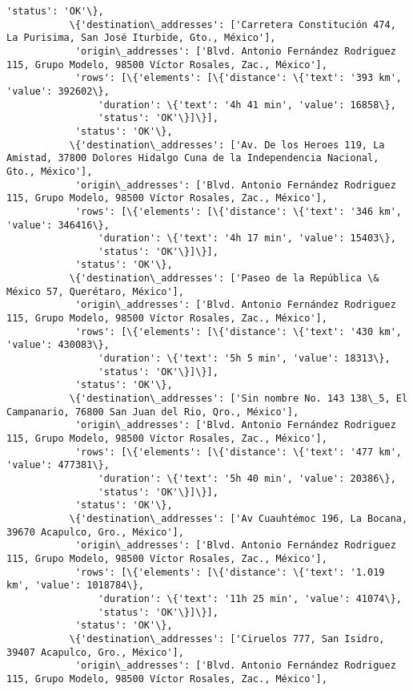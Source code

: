 \documentclass[11pt]{article}
\begin{document}
\begin{Verbatim}[commandchars=\\\{\}]
            'status': 'OK'\},
           \{'destination\_addresses': ['Carretera Constitución 474, La Purisima, San José Iturbide, Gto., México'],
            'origin\_addresses': ['Blvd. Antonio Fernández Rodriguez 115, Grupo Modelo, 98500 Víctor Rosales, Zac., México'],
            'rows': [\{'elements': [\{'distance': \{'text': '393 km', 'value': 392602\},
                'duration': \{'text': '4h 41 min', 'value': 16858\},
                'status': 'OK'\}]\}],
            'status': 'OK'\},
           \{'destination\_addresses': ['Av. De los Heroes 119, La Amistad, 37800 Dolores Hidalgo Cuna de la Independencia Nacional, Gto., México'],
            'origin\_addresses': ['Blvd. Antonio Fernández Rodriguez 115, Grupo Modelo, 98500 Víctor Rosales, Zac., México'],
            'rows': [\{'elements': [\{'distance': \{'text': '346 km', 'value': 346416\},
                'duration': \{'text': '4h 17 min', 'value': 15403\},
                'status': 'OK'\}]\}],
            'status': 'OK'\},
           \{'destination\_addresses': ['Paseo de la República \& México 57, Querétaro, México'],
            'origin\_addresses': ['Blvd. Antonio Fernández Rodriguez 115, Grupo Modelo, 98500 Víctor Rosales, Zac., México'],
            'rows': [\{'elements': [\{'distance': \{'text': '430 km', 'value': 430083\},
                'duration': \{'text': '5h 5 min', 'value': 18313\},
                'status': 'OK'\}]\}],
            'status': 'OK'\},
           \{'destination\_addresses': ['Sin nombre No. 143 138\_5, El Campanario, 76800 San Juan del Rio, Qro., México'],
            'origin\_addresses': ['Blvd. Antonio Fernández Rodriguez 115, Grupo Modelo, 98500 Víctor Rosales, Zac., México'],
            'rows': [\{'elements': [\{'distance': \{'text': '477 km', 'value': 477381\},
                'duration': \{'text': '5h 40 min', 'value': 20386\},
                'status': 'OK'\}]\}],
            'status': 'OK'\},
           \{'destination\_addresses': ['Av Cuauhtémoc 196, La Bocana, 39670 Acapulco, Gro., México'],
            'origin\_addresses': ['Blvd. Antonio Fernández Rodriguez 115, Grupo Modelo, 98500 Víctor Rosales, Zac., México'],
            'rows': [\{'elements': [\{'distance': \{'text': '1.019 km', 'value': 1018784\},
                'duration': \{'text': '11h 25 min', 'value': 41074\},
                'status': 'OK'\}]\}],
            'status': 'OK'\},
           \{'destination\_addresses': ['Ciruelos 777, San Isidro, 39407 Acapulco, Gro., México'],
            'origin\_addresses': ['Blvd. Antonio Fernández Rodriguez 115, Grupo Modelo, 98500 Víctor Rosales, Zac., México'],

\end{Verbatim}
\end{document}
